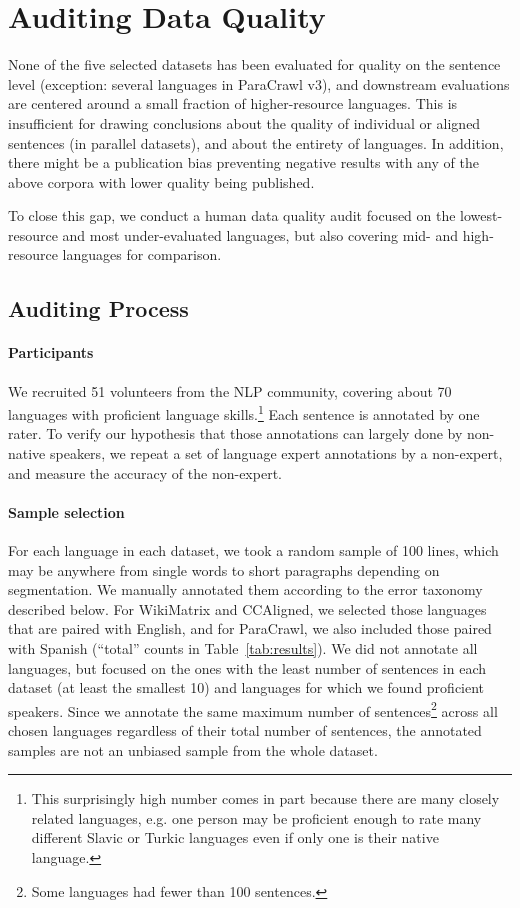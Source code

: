 \section{Auditing Data Quality}\label{sec:audit}
None of the five selected datasets has been evaluated for quality on the sentence level (exception: several languages in ParaCrawl v3), and downstream evaluations are centered around a small fraction of higher-resource languages. This is insufficient for drawing conclusions about the quality of individual or aligned sentences (in parallel datasets), and about the entirety of languages. In addition, there might be a publication bias preventing negative results with any of the above corpora with lower quality being published.

To close this gap, we conduct a human data quality audit focused on the lowest-resource and most under-evaluated languages, but also covering mid- and high-resource languages for comparison.

\subsection{Auditing Process}

\paragraph{Participants} We recruited 51 volunteers from the NLP community, covering about 70 languages with proficient language skills.\footnote{This surprisingly high number comes in part because there are many closely related languages, e.g. one person may be proficient enough to rate many different Slavic or Turkic languages even if only one is their native language.} Each sentence is annotated by one rater.
To verify our hypothesis that those annotations can largely done by non-native speakers, we repeat a set of language expert annotations by a non-expert, and measure the accuracy of the non-expert.

\paragraph{Sample selection} For each language in each dataset, we took a random sample of 100 lines, which may be anywhere from single words to short paragraphs depending on segmentation.
We manually annotated them according to the error taxonomy described below. For WikiMatrix and CCAligned, we selected those languages that are paired with English, and for ParaCrawl, we also included those paired with Spanish (``total'' counts in Table~\ref{tab:results}).
We did not annotate all languages, but focused on the ones with the least number of sentences in each dataset (at least the smallest 10) and languages for which we found proficient speakers.
Since we annotate the same maximum number of sentences\footnote{Some languages had fewer than 100 sentences.} across all chosen languages regardless of their total number of sentences, the annotated samples are not an unbiased sample from the whole dataset.

